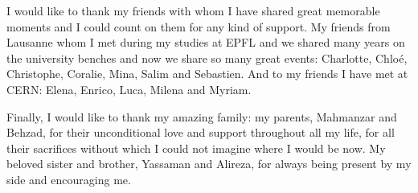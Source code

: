 I would like to thank my friends with whom I have shared great
memorable moments and I could count on them for any kind of
support. My friends from Lausanne whom I met during my studies at EPFL
and we shared many years on the university benches and now we share so
many great events: Charlotte, Chloé, Christophe, Coralie, Mina, Salim
and Sebastien. And to my friends I have met at CERN: Elena, Enrico,
Luca, Milena and Myriam.

Finally, I would like to thank my amazing family: my parents,
Mahmanzar and Behzad, for their unconditional love and support
throughout all my life, for all their sacrifices without which I could
not imagine where I would be now. My beloved sister and brother,
Yassaman and Alireza, for always being present by my side and
encouraging me.


